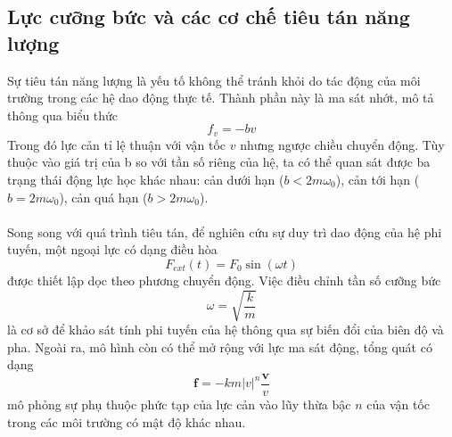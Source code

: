 \subsection{Lực cưỡng bức và các cơ chế tiêu tán năng lượng}
Sự tiêu tán năng lượng là yếu tố không thể tránh khỏi do tác động của môi trường trong các hệ dao động thực tế. Thành phần này là ma sát nhớt, mô tả thông qua biểu thức 
\begin{equation}
    f_v=-bv
\end{equation}
Trong đó lực cản tỉ lệ thuận với vận tốc $v$ nhưng ngược chiều chuyển động. Tùy thuộc vào giá trị của b so với tần số riêng của hệ, ta có thể quan sát được ba trạng thái động lực học khác nhau: cản dưới hạn ($b<2m\omega_0$), cản tới hạn ($b=2m\omega_0$), cản quá hạn ($b>2m\omega_0$).
\\
\\
Song song với quá trình tiêu tán, để nghiên cứu sự duy trì dao động của hệ phi tuyến, một ngoại lực có dạng điều hòa
\begin{equation}
    F_{ext}(t) = F_0\sin(\omega t)
\end{equation}
được thiết lập dọc theo phương chuyển động. Việc điều chỉnh tần số cưỡng bức
\begin{equation}
    \omega = \sqrt{\frac{k}{m}}
\end{equation}
là cơ sở để khảo sát tính phi tuyến của hệ thông qua sự biến đổi của biên độ và pha. Ngoài ra, mô hình còn có thể mở rộng với lực ma sát động, tổng quát có dạng
\begin{equation}
    \mathbf{f}=-km|v|^n\frac{\mathbf{v}}{v}
\end{equation}
mô phỏng sự phụ thuộc phức tạp của lực cản vào lũy thừa bậc $n$ của vận tốc trong các môi trường có mật độ khác nhau.


